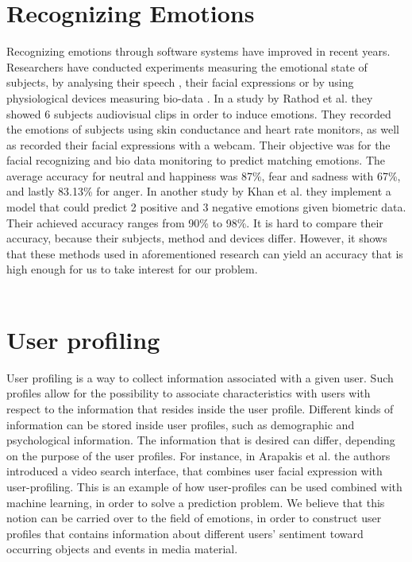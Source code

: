 \section{Recognizing Emotions}\label{sec:recogEmotions}
Recognizing emotions through software systems have improved in recent years. Researchers have conducted experiments measuring the emotional state of subjects, by analysing their speech \cite{SpeechEmotionRecognize}, their facial expressions \cite{FaceEmotionRecognize} or by using physiological devices measuring bio-data \cite{RecognizingEmotion, EmotionSense}. In a study by Rathod et al. \cite{BioSignalsEmotionModel} they showed 6 subjects audiovisual clips in order to induce emotions. They recorded the emotions of subjects using skin conductance and heart rate monitors, as well as recorded their facial expressions with a webcam. Their objective was for the facial recognizing and bio data monitoring to predict matching emotions. The average accuracy for neutral and happiness was 87\%, fear and sadness with 67\%, and lastly 83.13\% for anger. In another study by Khan et al. \cite{RecognizingEmotion} they implement a model that could predict 2 positive and 3 negative emotions given biometric data. Their achieved accuracy ranges from 90\% to 98\%. It is hard to compare their accuracy, because their subjects, method and devices differ. However, it shows that these methods used in aforementioned research can yield an accuracy that is high enough for us to take interest for our problem.
\\ \\

\section{User profiling}
User profiling is a way to collect information associated with a given user. Such profiles allow for the possibility to associate characteristics with users with respect to the information that resides inside the user profile. Different kinds of information can be stored inside user profiles, such as demographic and psychological information\cite{WhatIsUserProfiling}. 
The information that is desired can differ, depending on the purpose of the user profiles. For instance, in Arapakis et al\cite{Arapakis}. the authors introduced a video search interface, that combines user facial expression with user-profiling. This is an example of how user-profiles can be used combined with machine learning, in order to solve a prediction problem. 
We believe that this notion can be carried over to the field of emotions, in order to construct user profiles that contains information about different users' sentiment toward occurring objects and events in media material.

